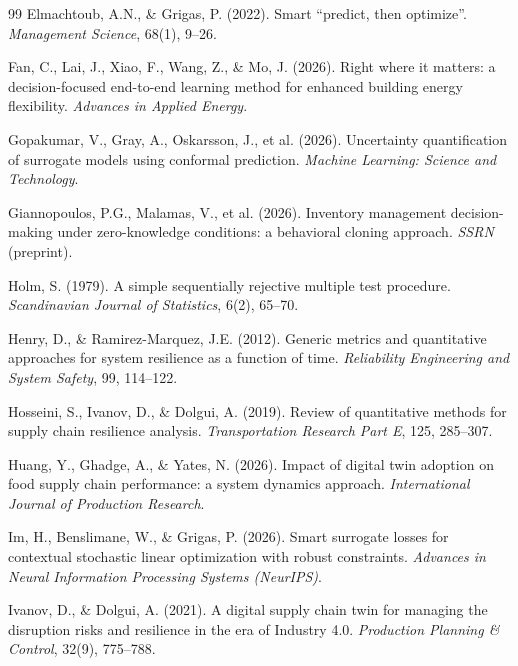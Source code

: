 \documentclass[12pt,a4paper]{article}
\begin{document}
\begin{thebibliography}{99}
 Elmachtoub, A.N., \& Grigas, P. (2022). Smart ``predict, then optimize''. \textit{Management Science}, 68(1), 9--26.

 Fan, C., Lai, J., Xiao, F., Wang, Z., \& Mo, J. (2026). Right where it matters: a decision-focused end-to-end learning method for enhanced building energy flexibility. \textit{Advances in Applied Energy}.

 Gopakumar, V., Gray, A., Oskarsson, J., et al. (2026). Uncertainty quantification of surrogate models using conformal prediction. \textit{Machine Learning: Science and Technology}.

 Giannopoulos, P.G., Malamas, V., et al. (2026). Inventory management decision-making under zero-knowledge conditions: a behavioral cloning approach. \textit{SSRN} (preprint).

 Holm, S. (1979). A simple sequentially rejective multiple test procedure. \textit{Scandinavian Journal of Statistics}, 6(2), 65--70.

 Henry, D., \& Ramirez-Marquez, J.E. (2012). Generic metrics and quantitative approaches for system resilience as a function of time. \textit{Reliability Engineering and System Safety}, 99, 114--122.

 Hosseini, S., Ivanov, D., \& Dolgui, A. (2019). Review of quantitative methods for supply chain resilience analysis. \textit{Transportation Research Part E}, 125, 285--307.

 Huang, Y., Ghadge, A., \& Yates, N. (2026). Impact of digital twin adoption on food supply chain performance: a system dynamics approach. \textit{International Journal of Production Research}.

 Im, H., Benslimane, W., \& Grigas, P. (2026). Smart surrogate losses for contextual stochastic linear optimization with robust constraints. \textit{Advances in Neural Information Processing Systems (NeurIPS)}.

 Ivanov, D., \& Dolgui, A. (2021). A digital supply chain twin for managing the disruption risks and resilience in the era of Industry 4.0. \textit{Production Planning \& Control}, 32(9), 775--788.


\end{thebibliography}
\end{document}
